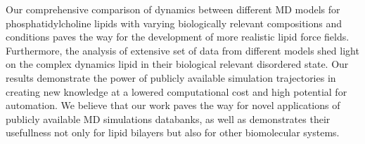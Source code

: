 \documentclass[journal=jpcbfk,manuscript=article,layout=twocolumn]{achemso}
\begin{document}

Our comprehensive comparison of dynamics between different MD models for phosphatidylcholine lipids
with varying biologically relevant compositions and conditions paves the way for the development of more realistic lipid force fields.
Furthermore, the analysis of extensive set of data from different models shed light on the complex
dynamics lipid in their biological relevant disordered state.
Our results demonstrate the power of publicly available simulation trajectories  %
in creating new knowledge at a lowered computational cost and high potential for automation.  
We believe that our work paves the way for novel applications of publicly
available MD simulations databanks, as well as demonstrates their usefullness not only for lipid bilayers
but also for other biomolecular systems.


\end{document}
